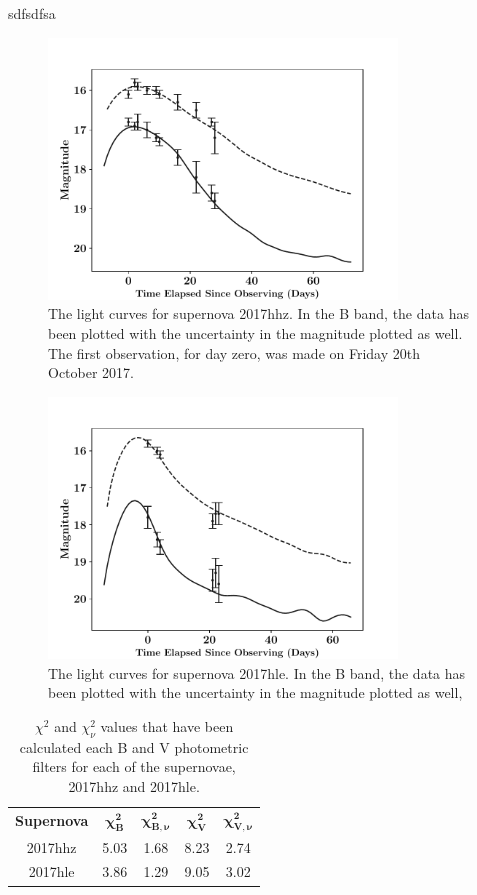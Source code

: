 \documentclass[twocolumn]{revtex4}
\begin{document}
sdfsdfsa

\begin{figure}[!h]
\begin{center}
\includegraphics[width=9.25cm]{results/2017hhz}
\caption[]{The light curves for supernova 2017hhz. In the B band, the data has been plotted with the uncertainty in the magnitude plotted as well. The first observation, for day zero, was made on Friday 20th October 2017.}
\label{2017hhz-data}
\end{center}
\end{figure}

\begin{figure}[!h]
\begin{center}
\includegraphics[width=9.25cm]{results/2017hle}
\caption[]{The light curves for supernova 2017hle. In the B band, the data has been plotted with the uncertainty in the magnitude plotted as well, }
\label{2017hle-data}
\end{center}
\end{figure}

\begin{table}[h!]
\centering
\begin{tabular}{c@{\hskip 20pt}c@{\hskip 20pt}c@{\hskip 20pt}c@{\hskip 20pt}c} 
 \hline
 \textbf{Supernova} & \textbf{$\boldsymbol{\chi^2_B}$} & \textbf{$\boldsymbol{\chi^2_{B,\nu}}$} & \textbf{$\boldsymbol{\chi^2_V}$} & \textbf{$\boldsymbol{\chi^2_{V,\nu}}$} \\ [0.5ex] 
 2017hhz & 5.03 & 1.68 & 8.23 & 2.74 \\
 2017hle & 3.86 & 1.29 & 9.05 & 3.02 \\
 \hline
\end{tabular}
\caption{$\chi^2$ and $\chi^2_{\nu}$ values that have been calculated each B and V photometric filters for each of the supernovae, 2017hhz and 2017hle.}
\label{chi2-table}
\end{table}
\end{document}
